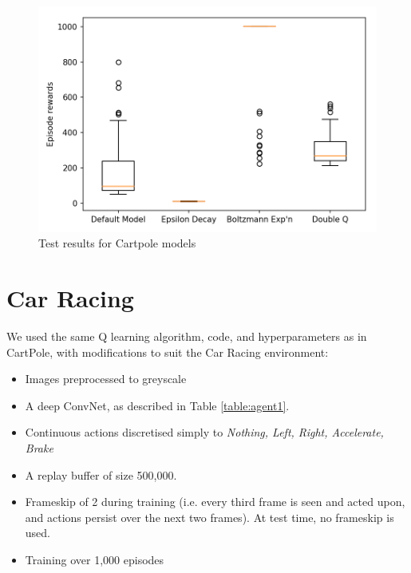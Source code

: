\documentclass[a4paper, 11pt, conference]{ieeeconf}      %
\begin{document}
\begin{figure}
  \includegraphics[width=\linewidth]{figs/cartpole_test.png}
  \caption{Test results for Cartpole models}
  \label{fig:test0}
\end{figure}

\section{Car Racing}

We used the same Q learning algorithm, code, and hyperparameters as in CartPole, with modifications to suit the Car Racing environment:

\begin{itemize}
	\item Images preprocessed to greyscale

	\item A deep ConvNet, as described in Table \ref{table:agent1}.

  \item Continuous actions discretised simply to \textit{Nothing, Left, Right, Accelerate, Brake}

  \item A replay buffer of size 500,000.

  \item Frameskip of 2 during training (i.e. every third frame is seen and acted upon, and actions persist over the next two frames). At test time, no frameskip is used.

  \item Training over 1,000 episodes

\end{itemize}
\end{document}
